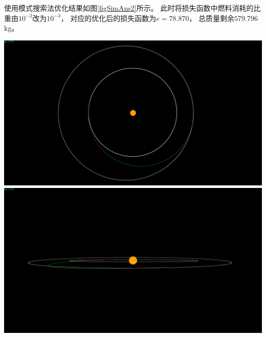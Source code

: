 使用模式搜索法优化结果如图\ref{figSimAns2}所示。
此时将损失函数中燃料消耗的比重由$10^{-2}$改为$10^{-3}$，
对应的优化后的损失函数为$e=78.870$，
总质量剩余$579.796$kg。
\begin{center}
	\includegraphics[scale=0.2]{simans3.png}  \\
	\includegraphics[scale=0.2]{simans4.png}  \\
	\label{figSimAns2}
\end{center}

